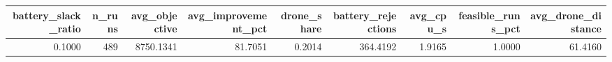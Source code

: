 \begin{tabular}{rrrrrrrrr}
\toprule
battery_slack_ratio & n_runs & avg_objective & avg_improvement_pct & drone_share & battery_rejections & avg_cpu_s & feasible_runs_pct & avg_drone_distance \\
\midrule
0.1000 & 489 & 8750.1341 & 81.7051 & 0.2014 & 364.4192 & 1.9165 & 1.0000 & 61.4160 \\
\bottomrule
\end{tabular}
